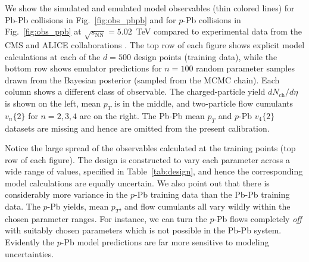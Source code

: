 \documentclass[aps,prc,reprint,amsmath,nofootinbib]{revtex4-1}
\newcommand{\sqrts}{\sqrt{s_\mathrm{NN}}}
\newcommand{\nch}{N_\text{ch}}
\newcommand{\vnk}[2]{v_#1\{#2\}}
\begin{document}
We show the simulated and emulated model observables (thin colored lines) for Pb-Pb collisions in Fig.~\ref{fig:obs_pbpb} and for \mbox{$p$-Pb} collisions in Fig.~\ref{fig:obs_ppb} at $\sqrts=5.02$~TeV compared to experimental data from the CMS \cite{Chatrchyan:2013nka} and ALICE collaborations \cite{Adam:2015ptt, Adam:2016izf, Adam:2014qja, Abelev:2013bla}.
The top row of each figure shows explicit model calculations at each of the $d=500$ design points (training data), while the bottom row shows emulator predictions for $n=100$ random parameter samples drawn from the Bayesian posterior (sampled from the MCMC chain).
Each column shows a different class of observable.
The charged-particle yield $d\nch/d\eta$ is shown on the left, mean $p_T$ is in the middle, and two-particle flow cumulants $\vnk{n}{2}$ for $n=2,3,4$ are on the right.
The Pb-Pb mean $p_T$ and $p$-Pb $\vnk{4}{2}$ datasets are missing and hence are omitted from the present calibration.

Notice the large spread of the observables calculated at the training points (top row of each figure).
The design is constructed to vary each parameter across a wide range of values, specified in Table~\ref{tab:design}, and hence the corresponding model calculations are equally uncertain.
We also point out that there is considerably more variance in the $p$-Pb training data than the Pb-Pb training data.
The $p$-Pb yields, mean $p_T$, and flow cumulants all vary wildly within the chosen parameter ranges.
For instance, we can turn the $p$-Pb flows completely \emph{off} with suitably chosen parameters which is not possible in the Pb-Pb system.
Evidently the $p$-Pb model predictions are far more sensitive to modeling uncertainties.
\end{document}
